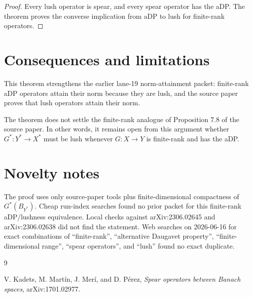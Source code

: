 \documentclass[11pt]{article}
\begin{document}
\begin{proof}
Every lush operator is spear, and every spear operator has the aDP.  The
theorem proves the converse implication from aDP to lush for finite-rank
operators.
\end{proof}

\section*{Consequences and limitations}

This theorem strengthens the earlier lane-19 norm-attainment packet:
finite-rank aDP operators attain their norm because they are lush, and the
source paper proves that lush operators attain their norm.

The theorem does not settle the finite-rank analogue of Proposition 7.8 of
the source paper.  In other words, it remains open from this argument
whether \(G^*:Y^*\to X^*\) must be lush whenever \(G:X\to Y\) is finite-rank
and has the aDP.

\section*{Novelty notes}

The proof uses only source-paper tools plus finite-dimensional compactness
of \(G^*(B_{Y^*})\).  Cheap run-index searches found no prior packet for this
finite-rank aDP/lushness equivalence.  Local checks against arXiv:2306.02645
and arXiv:2306.02638 did not find the statement.  Web searches on
2026-06-16 for exact combinations of ``finite-rank'', ``alternative Daugavet
property'', ``finite-dimensional range'', ``spear operators'', and ``lush''
found no exact duplicate.

\begin{thebibliography}{9}

V. Kadets, M. Mart\'in, J. Mer\'i, and D. P\'erez,
\emph{Spear operators between Banach spaces},
arXiv:1701.02977.

\end{thebibliography}
\end{document}
